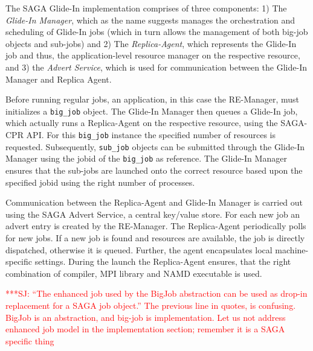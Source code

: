 \documentclass{rspublic}
\newcommand{\jhanote}[1]{ {\textcolor{red} { ***SJ: #1 }}}
\newcommand{\jhanote}[1]{}
\newcommand{\replicaagent}[1]{Replica-Agent }
\begin{document}
The SAGA Glide-In implementation comprises of three components: 1) The
\emph{Glide-In Manager}, which as the name suggests manages the
orchestration and scheduling of Glide-In jobs (which in turn allows
the management of both big-job objects and sub-jobs) and 2) The
\emph{Replica-Agent}, which represents the Glide-In job and thus, the
application-level resource manager on the respective resource, and 3)
the \emph{Advert Service}, which is used for communication between the
Glide-In Manager and Replica Agent.

  

Before running regular jobs, an application, in this case the 
RE-Manager, must initializes a
\texttt{big\_job} object. The Glide-In Manager then queues a Glide-In
job, which actually runs a Replica-Agent on the respective resource,
using the SAGA-CPR API.  For this \texttt{big\_job} instance the
specified number of resources is requested. Subsequently,
\texttt{sub\_job} objects can be submitted through the Glide-In
Manager using the jobid of the \texttt{big\_job} as reference.
The Glide-In Manager ensures that the sub-jobs are launched onto the 
correct resource based upon the specified jobid using the right number
of processes.

Communication between the Replica-Agent and Glide-In Manager is
carried out using the SAGA Advert Service, a central key/value
store. For each new job an advert entry is created by the
RE-Manager. The \replicaagent\ periodically polls for new jobs.  If a
new job is found and resources are available, the job is directly
dispatched, otherwise it is queued. Further, the agent encapsulates
local machine-specific settings. During the launch the \replicaagent\
ensures, that the right combination of compiler, MPI library and NAMD
executable is used.

\jhanote{``The enhanced job used by the BigJob abstraction can be used
  as drop-in replacement for a SAGA job object.'' The previous line in
  quotes, is confusing. BigJob is an abstraction, and big-job is
  implementation. Let us not address enhanced job model in the
  implementation section; remember it is a SAGA specific thing}
\end{document}
